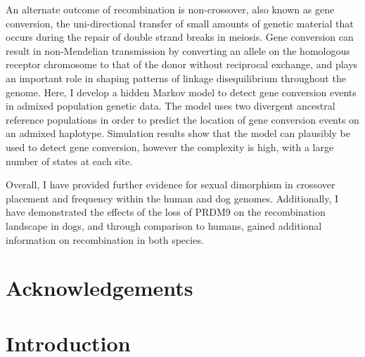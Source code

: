 \documentclass[11pt,twoside,openright,letterpaper]{memoir}
\begin{document}
An alternate outcome of recombination is non-crossover, also known as gene conversion, the uni-directional transfer of small amounts of genetic material that occurs during the repair of double strand breaks in meiosis.
Gene conversion can result in non-Mendelian transmission by converting an allele on the homologous receptor chromosome to that of the donor without reciprocal exchange, and plays an important role in shaping patterns of linkage disequilibrium throughout the genome.
Here, I develop a hidden Markov model to detect gene conversion events in admixed population genetic data.
The model uses two divergent ancestral reference populations in order to predict the location of gene conversion events on an admixed haplotype.
Simulation results show that the model can plausibly be used to detect gene conversion, however the complexity is high, with a large number of states at each site.

Overall, I have provided further evidence for sexual dimorphism in crossover placement and frequency within the human and dog genomes. Additionally, I have demonstrated the effects of the loss of PRDM9 on the recombination landscape in dogs, and through comparison to humans, gained additional information on recombination in both species.



\chapter{Acknowledgements}

\SingleSpacing
\clearpage
\tableofcontents
\listoffigures
\listoftables

\glsaddall
\clearpage\begingroup\let\newpage\relax
    \printglossary[type=main,style=long,nonumberlist,title={List of Abbreviations}]
\endgroup


\mainmatter

 \DoubleSpacing
\chapter{Introduction} \label{ch:introduction}

\end{document}
